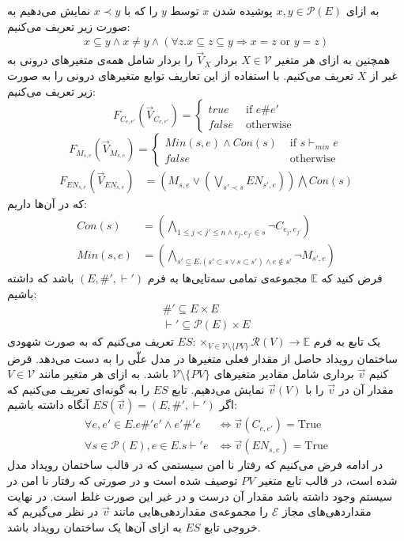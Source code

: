 \documentclass[
msc,
irfonts
]{./tex/tehran-thesis}
\newcommand{\پ}{پروژه/پایان‌نامه/رساله }
\theoremstyle{definition}
\theoremstyle{theorem}
\theoremstyle{definition}
\numberwithin{algorithm}{chapter}
\newcommand{\T}{\mathrm{True}}
\newcommand{\s}[1]{\{#1\}}
\newcommand{\mc}[1]{\mathcal{#1}}
\newcommand{\f}[1]{F_{#1}(\vec V_{#1})}
\newcommand{\lf}[1]{\LTRfootnote{#1}}
\begin{document}
به ازای
$x,y \in \mc{P}(E)$
پوشیده
شدن\lf{Covering}
$x$
توسط
$y$
را که با
$x \prec y$
نمایش می‌دهیم به صورت زیر تعریف می‌کنیم:
\begin{align*}
    x \subseteq y \wedge x \neq y \wedge
    (\forall z. x \subseteq z \subseteq y \Rightarrow x = z
    \text{ or } y = z)
\end{align*}
همچنین به ازای هر متغیر
$X \in \mc{V}$
بردار
$\vec V_X$
را بردار شامل همه‌ی متغیر‌های درونی به غیر از
$X$
تعریف می‌کنیم.
با استفاده از این تعاریف
توابع متغیر‌های درونی را به صورت زیر تعریف می‌کنیم:
$$
    \f{C_{e,e'}} = \begin{cases}
        true  & \text{ if } e \# e' \\
        false & \text{ otherwise }
    \end{cases}
$$
$$
    \f{M_{s,e}} = \begin{cases}
        Min(s,e) \wedge Con(s) & \text{ if } s \vdash_{min} e \\
        false                  & \text{ otherwise }
    \end{cases}
$$
\begin{align*}
    \f{EN_{s,e}} & =
    \left(
    M_{s,e} \vee
    \left(
    \bigvee_{s'\prec s}EN_{s',e}
    \right)
    \right)
    \bigwedge
    Con(s)
\end{align*}
که در آن‌ها داریم:
\begin{align*}
    Con(s)   & =   \left(
    \bigwedge_{ 1\leq j<j' \leq n \wedge e_j,e_{j'} \in s}
    \neg C_{e_j,e_{j'}}
    \right)               \\
    Min(s,e) & = \left(
    \bigwedge_{s' \subseteq E. (s' \subset s \vee s \subset s')
        \wedge e \notin s'}
    \neg M_{s',e}
    \right)
\end{align*}
فرض کنید که
$\mathbb{E}$
مجموعه‌ی تمامی سه‌تایی‌ها به فرم
$(E,\#',\vdash')$
باشد که داشته باشیم:
\begin{align*}
    \#' \subseteq E \times E \\
    \vdash' \subseteq \mc{P}(E)\times E
\end{align*}
یک تابع به فرم
$ES: \times_{V \in \mathcal{V}\setminus \s{PV}} \mathcal{R}(V) \rightarrow \mathbb{E}$
تعریف می‌کنیم که به صورت شهودی ساختمان رویداد حاصل از مقدار فعلی متغیر‌ها در مدل علّی را به دست می‌دهد.
فرض کنیم
$\vec v$
برداری شامل مقادیر متغیرهای
$\mc{V} \setminus \s{PV}$
باشد.
به ازای هر متغیر مانند
$V \in \mc{V}$
مقدار آن در
$\vec v$
را با
$\vec v(V)$
نمایش می‌دهیم.
تابع
$ES$
را به گونه‌ای تعریف می‌کنیم که اگر
$ES(\vec v) = (E,\#',\vdash')$
آنگاه داشته باشیم:
\begin{align*}
    \forall e,e' \in E. e \#' e' \wedge e' \#' e
     & \iff \vec{v}(C_{e,e'}) = \T \\
    \forall s \in \mathcal{P}(E), e \in E.  s \vdash' e
     & \iff \vec{v}(EN_{s,e}) = \T
\end{align*}
در ادامه فرض می‌کنیم که رفتار نا‌ امن\lf{Unsafe Behavior}
سیستمی که در قالب ساختمان رویداد مدل شده است، در قالب تابع متغیر
$PV$
توصیف شده است و در صورتی که رفتار نا ‌امن در سیستم وجود داشته باشد مقدار آن درست و در غیر این صورت غلط است.
در نهایت مقداردهی‌های مجاز
$\mc{E}$
را مجموعه‌ی مقداردهی‌هایی مانند
$\vec v$
در نظر می‌گیریم که خروجی تابع
$ES$
به ازای آن‌ها یک ساختمان رویداد باشد.
\end{document}
